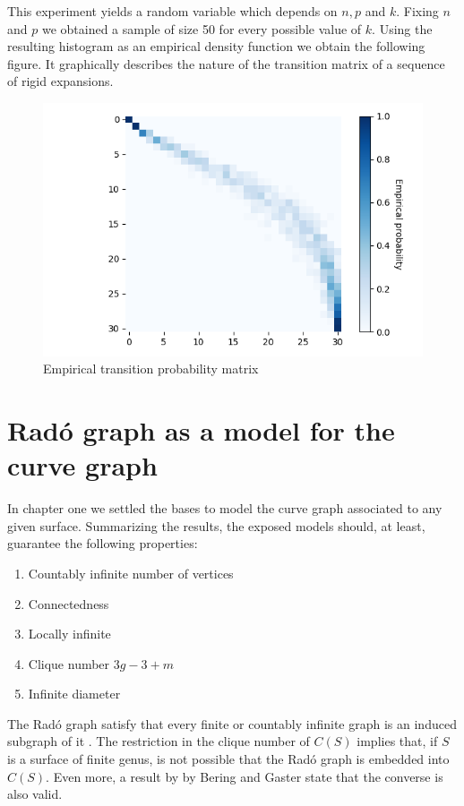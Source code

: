 This experiment yields a random variable which depends on $n, p$ and $k$. Fixing $n$ and $p$ we obtained a sample of size 50 for every possible value of $k$. Using the resulting histogram as an empirical density function we obtain the following figure. It graphically describes the nature of the transition matrix of a sequence of rigid expansions.

\begin{figure}[h!]
	\centering
	\includegraphics[scale=0.7]{Python/Figures/Transition-matrix-secuence-of-rigid-expansions.png}
	\caption{Empirical transition probability matrix}
\end{figure}

\section{Radó graph as a model for the curve graph}

In chapter one we settled the bases to model the curve graph associated to any given surface. Summarizing the results, the exposed models should, at least, guarantee the following properties:

\begin{enumerate}
\item Countably infinite number of vertices
\item Connectedness
\item Locally infinite
\item Clique number $3g-3+m$
\item Infinite diameter
\end{enumerate}

The Radó graph satisfy that every finite or countably infinite graph is an induced subgraph of it \cite{theRandomGraph}. The restriction in the clique number of $C(S)$ implies that, if $S$ is a surface of finite genus, is not possible that the Radó graph is embedded into $C(S)$. Even more, a result by by Bering and Gaster \cite{beringGaster} state that the converse is also valid.

